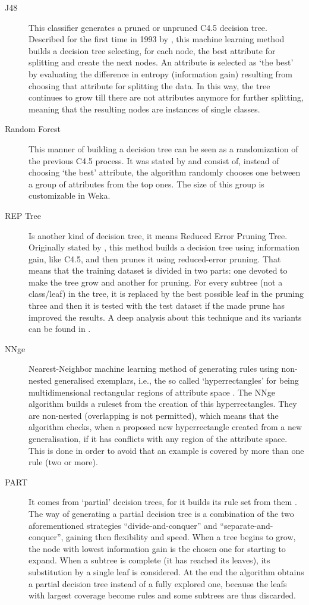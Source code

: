 \documentclass{llncs}
\begin{document}
\begin{description}
   \item[J48] This classifier generates a pruned or unpruned C4.5 decision tree. Described for the first time in 1993 by \cite{Quinlan1993}, this machine learning method builds a decision tree selecting, for each node, the best attribute for splitting and create the next nodes. An attribute is selected as `the best' by evaluating the difference in entropy (information gain) resulting from choosing that attribute for splitting the data. In this way, the tree continues to grow till there are not attributes anymore for further splitting, meaning that the resulting nodes are instances of single classes. 
   \item[Random Forest] This manner of building a decision tree can be seen as a randomization of the previous C4.5 process. It was stated by \cite{Breiman2001} and consist of, instead of choosing `the best' attribute, the algorithm randomly chooses one between a group of attributes from the top ones. The size of this group is customizable in Weka.
   \item[REP Tree] Is another kind of decision tree, it means Reduced Error Pruning Tree. Originally stated by \cite{Quinlan1987}, this method builds a decision tree using information gain, like C4.5, and then prunes it using reduced-error pruning. That means that the training dataset is divided in two parts: one devoted to make the tree grow and another for pruning. For every subtree (not a class/leaf) in the tree, it is replaced by the best possible leaf in the pruning three and then it is tested with the test dataset if the made prune has improved the results. A deep analysis about this technique and its variants can be found in \cite{Elomaa2001}.
   \item[NNge] Nearest-Neighbor machine learning method of generating rules using non-nested generalised exemplars, i.e., the so called `hyperrectangles' for being multidimensional rectangular regions of attribute space \cite{Martin1995}. The NNge algorithm builds a ruleset from the creation of this hyperrectangles. They are non-nested (overlapping is not permitted), which means that the algorithm checks, when a proposed new hyperrectangle created from a new generalisation, if it has conflicts with any region of the attribute space. This is done in order to avoid that an example is covered by more than one rule (two or more).
   \item[PART] It comes from `partial' decision trees, for it builds its rule set from them \cite{Frank1998}. The way of generating a partial decision tree is a combination of the two aforementioned strategies ``divide-and-conquer'' and ``separate-and-conquer'', gaining then flexibility and speed. When a tree begins to grow, the node with lowest information gain is the chosen one for starting to expand. When a subtree is complete (it has reached its leaves), its substitution by a single leaf is considered. At the end the algorithm obtains a partial decision tree instead of a fully explored one, because the leafs with largest coverage become rules and some subtrees are thus discarded.
 \end{description} 
\end{document}
